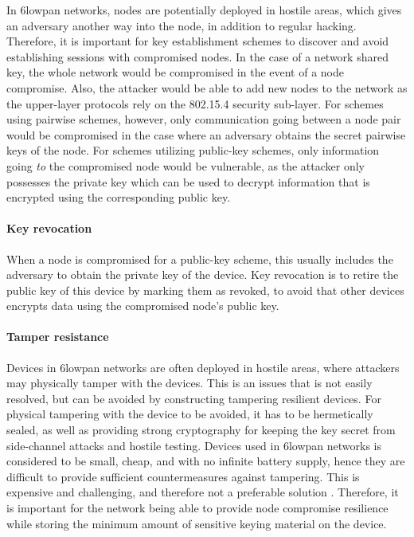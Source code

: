 In \gls{6lowpan} networks, nodes are potentially deployed in hostile areas, which gives an adversary another way into the node, in addition to regular hacking. Therefore, it is important for key establishment schemes to discover and avoid establishing sessions with compromised nodes. In the case of a network shared key, the whole network would be compromised in the event of a node compromise. Also, the attacker would be able to add new nodes to the network as the upper-layer protocols rely on the 802.15.4 security sub-layer. For schemes using pairwise schemes, however, only communication going between a node pair would be compromised in the case where an adversary obtains the secret pairwise keys of the node. For schemes utilizing public-key schemes, only information going \emph{to} the compromised node would be vulnerable, as the attacker only possesses the private key which can be used to decrypt information that is encrypted using the corresponding public key.

\paragraph{Key revocation}

When a node is compromised for a public-key scheme, this usually includes the adversary to obtain the private key of the device. Key revocation is to retire the public key of this device by marking them as revoked, to avoid that other devices encrypts data using the compromised node's public key. 

\paragraph{Tamper resistance} Devices in \gls{6lowpan} networks are often deployed in hostile areas, where attackers may physically tamper with the devices. This is an issues that is not easily resolved, but can be avoided by constructing tampering resilient devices. For physical tampering with the device to be avoided, it has to be hermetically sealed, as well as providing strong cryptography for keeping the key secret from side-channel attacks and hostile testing. Devices used in \gls{6lowpan} networks is considered to be small, cheap, and with no infinite battery supply, hence they are difficult to provide sufficient countermeasures against tampering. This is expensive and challenging, and therefore not a preferable solution \cite{anderson1996tamper}. Therefore, it is important for the network being able to provide node compromise resilience while storing the minimum amount of sensitive keying material on the device.


